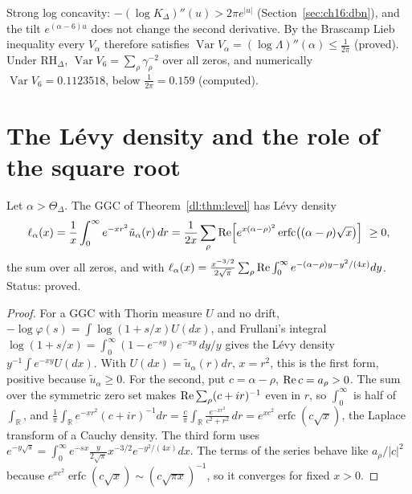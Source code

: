 Strong log concavity: $-(\log K_\Delta)''(u)>2\pi e^{|u|}$ (Section~\ref{sec:ch16:dbn}), and the tilt $e^{(\alpha-6)u}$ does not change the second derivative. By the Brascamp Lieb inequality every $V_\alpha$ therefore satisfies $\operatorname{Var}V_\alpha=(\log\Lambda)''(\alpha)\le\frac1{2\pi}$ (proved). Under $\mathrm{RH}_\Delta$, $\operatorname{Var}V_6=\sum_\rho\gamma_\rho^{-2}$ over all zeros, and numerically $\operatorname{Var}V_6=0.1123518$, below $\frac1{2\pi}=0.159$ (computed).

\section{The L\'evy density and the role of the square root}\label{dl:sec:levy}

\begin{theorem}\label{dl:thm:levy}
Let $\alpha>\Theta_\Delta$. The GGC of Theorem~\ref{dl:thm:level} has L\'evy density
\begin{equation}\label{dl:eq:levy}
\ell_\alpha(x)=\frac1x\int_0^\infty e^{-xr^2}\tilde u_\alpha(r)\,dr=\frac1{2x}\sum_\rho\operatorname{Re}\Bigl[e^{x(\alpha-\rho)^2}\operatorname{erfc}\bigl((\alpha-\rho)\sqrt x\bigr)\Bigr]\ \ge0,
\end{equation}
the sum over all zeros, and with $\ell_\alpha(x)=\frac{x^{-3/2}}{2\sqrt\pi}\sum_\rho\operatorname{Re}\int_0^\infty e^{-(\alpha-\rho)y-y^2/(4x)}dy$. Status: proved.
\end{theorem}

\begin{proof}
For a GGC with Thorin measure $U$ and no drift, $-\log\varphi(s)=\int\log(1+s/x)U(dx)$, and Frullani's integral $\log(1+s/x)=\int_0^\infty(1-e^{-sy})e^{-xy}\,dy/y$ gives the L\'evy density $y^{-1}\int e^{-xy}U(dx)$. With $U(dx)=\tilde u_\alpha(r)dr$, $x=r^2$, this is the first form, positive because $\tilde u_\alpha\ge0$. For the second, put $c=\alpha-\rho$, $\operatorname{Re} c=a_\rho>0$. The sum over the symmetric zero set makes $\operatorname{Re}\sum_\rho(c+ir)^{-1}$ even in $r$, so $\int_0^\infty$ is half of $\int_{\mathbb R}$, and $\frac1\pi\int_{\mathbb R}e^{-xr^2}(c+ir)^{-1}dr=\frac c\pi\int_{\mathbb R}\frac{e^{-xr^2}}{c^2+r^2}\,dr=e^{xc^2}\operatorname{erfc}(c\sqrt x)$, the Laplace transform of a Cauchy density. The third form uses $e^{-y\sqrt s}=\int_0^\infty e^{-sx}\frac{y}{2\sqrt\pi}x^{-3/2}e^{-y^2/(4x)}dx$. The terms of the series behave like $a_\rho/|c|^2$ because $e^{xc^2}\operatorname{erfc}(c\sqrt x)\sim(c\sqrt{\pi x})^{-1}$, so it converges for fixed $x>0$.
\end{proof}

